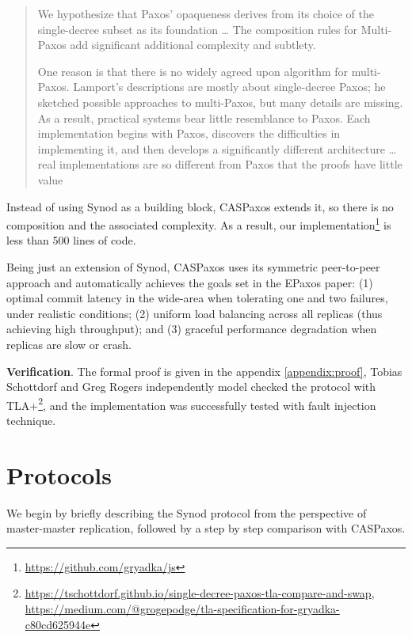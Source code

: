 \documentclass[12pt]{article}
\theoremstyle{definition}
\begin{document}
\begin{quote}
We hypothesize that Paxos’ opaqueness derives from its choice of the single-decree subset as its foundation \ldots{} The composition rules for Multi-Paxos add significant additional complexity and subtlety.

One reason is that there is no widely agreed upon algorithm for multi-Paxos. Lamport’s descriptions are mostly about single-decree Paxos; he sketched possible approaches to multi-Paxos, but many details are missing. As a result, practical systems bear little resemblance to Paxos. Each implementation begins with Paxos, discovers the difficulties in implementing it, and then develops a significantly different architecture \ldots{} real implementations are so different from Paxos that the proofs have little value
\end{quote}

Instead of using Synod as a building block, CASPaxos extends it, so there is no composition and the associated complexity. As a result, our implementation\footnote{\href{https://github.com/gryadka/js}{https://github.com/gryadka/js}} is less than 500 lines of code.

Being just an extension of Synod, CASPaxos uses its symmetric peer-to-peer approach and automatically achieves the goals set in the EPaxos\cite{epaxos} paper: (1) optimal commit latency in the wide-area when tolerating one and two failures, under realistic conditions; (2) uniform load balancing across all replicas (thus achieving high throughput); and (3) graceful performance degradation when replicas are slow or crash.

{\bf Verification}. The formal proof is given in the appendix \ref{appendix:proof}, Tobias Schottdorf and Greg Rogers independently model checked the protocol with TLA+\footnote{\href{https://tschottdorf.github.io/single-decree-paxos-tla-compare-and-swap}{https://tschottdorf.github.io/single-decree-paxos-tla-compare-and-swap}, \href{https://medium.com/@grogepodge/tla-specification-for-gryadka-c80cd625944e}{https://medium.com/@grogepodge/tla-specification-for-gryadka-c80cd625944e}}, and the implementation was successfully tested with fault injection technique.

\section{Protocols}

We begin by briefly describing the Synod protocol from the perspective of master-master replication, followed by a step by step comparison with CASPaxos.
\end{document}
